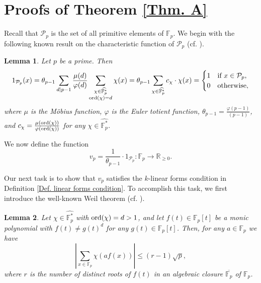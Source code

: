 \documentclass[12pt]{amsart}
\def\ord{{\rm ord}}
\theoremstyle{plain}
\newtheorem{lemma}{Lemma}
\theoremstyle{remark}
\begin{document}
	
	
	
	
	\section{Proofs of Theorem \ref{Thm. A}}
	\setcounter{lemma}{0}
	\setcounter{theorem}{0}
	\setcounter{equation}{0}
	\setcounter{conjecture}{0}
	\setcounter{remark}{0}
	\setcounter{corollary}{0}
	
	Recall that $\mathcal{P}_p$ is the set of all primitive elements of $\mathbb{F}_p$. We begin with the following known result on the characteristic function of $\mathcal{P}_p$ (cf. \cite{Cohen15,Cohen21}).
	
	\begin{lemma}\label{Lem. characteristic function of P}
		Let $p$ be a prime. Then 
		$$1_{\mathcal{P}_p}(x)=\theta_{p-1}\sum_{d\mid p-1}\frac{\mu(d)}{\varphi(d)}\sum_{\substack{\chi\in\widehat{\mathbb{F}_p^*} \\ \ord(\chi)=d}} \chi(x)=\theta_{p-1}\sum_{\chi\in\widehat{\mathbb{F}_p^*}}c_{\chi}\cdot \chi(x)
		=\begin{cases}
			1  & \mbox{if}\ x\in\mathcal{P}_p,\\
			0 & \mbox{otherwise},
		\end{cases}$$
		where $\mu$ is the M\"obius function, $\varphi$ is the Euler totient function, $\theta_{p-1}=\frac{\varphi(p-1)}{(p-1)}$, and $c_{\chi}=\frac{\mu(\ord(\chi))}{\varphi(\ord(\chi))}$ for any $\chi\in\widehat{\mathbb{F}_p^*}$. 
	\end{lemma}
	
	We now define the function 
	\begin{equation}\label{Eq. definition of vp}
		v_p=\frac{1}{\theta_{p-1}}\cdot 1_{\mathcal{P}_p}: \mathbb{F}_p\rightarrow \mathbb{R}_{\ge 0}.
	\end{equation}
	
	Our next task is to show that $v_p$ satisfies the $k$-linear forms condition in Definition \ref{Def. linear forms condition}. To accomplish this task, we first introduce the well-known Weil theorem (cf. \cite[Theorem 5.41]{LN}).
	
	\begin{lemma}\label{Lem. the Weil Bound}
		Let $\chi\in\widehat{\mathbb{F}_p^*}$ with $\ord(\chi)=d>1$, and let $f(t)\in\mathbb{F}_p[t]$ be a monic polynomial with $f(t)\neq g(t)^d$ for any $g(t)\in\mathbb{F}_p[t]$. Then, for any $a\in\mathbb{F}_p$ we have 
		$$\left|\sum_{x\in\mathbb{F}_p}\chi(af(x))\right|\le (r-1)\sqrt{p},$$
		where $r$ is the number of distinct roots of $f(t)$ in an algebraic closure $\overline{\mathbb{F}_p}$ of $\mathbb{F}_p$.
	\end{lemma}
	
\end{document}
